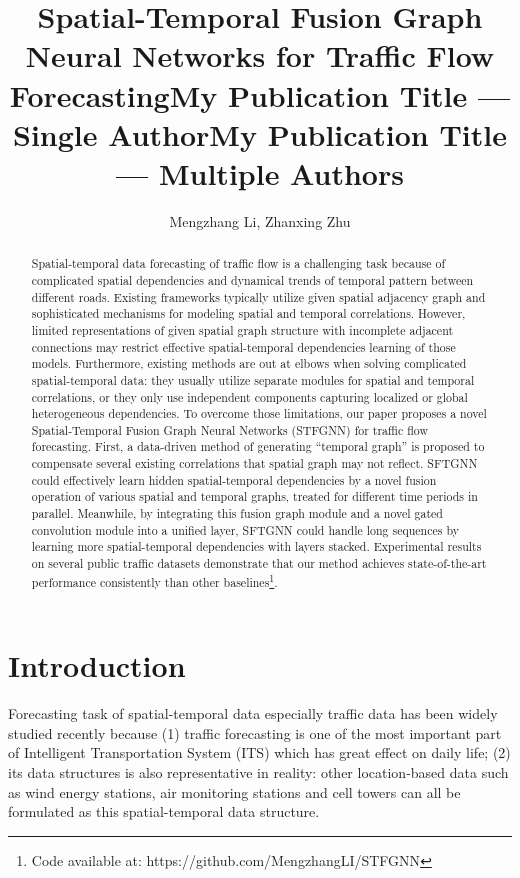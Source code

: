 \documentclass[letterpaper]{article} \usepackage{aaai21}  \usepackage{times}  \usepackage{helvet} \usepackage{courier}  \usepackage[hyphens]{url}  \usepackage{graphicx} \urlstyle{rm} \def\UrlFont{\rm}  \usepackage{natbib}  \usepackage{caption} \frenchspacing  \setlength{\pdfpagewidth}{8.5in}  \setlength{\pdfpageheight}{11in}  \usepackage{multirow}
\title{Spatial-Temporal Fusion Graph Neural Networks for Traffic Flow Forecasting}
\author{
Mengzhang Li, Zhanxing Zhu\\
}
\title{My Publication Title --- Single Author}
\title{My Publication Title --- Multiple Authors}
\begin{document}
\maketitle

\begin{abstract}
Spatial-temporal data forecasting of traffic flow is a challenging task because of complicated spatial dependencies and dynamical trends of temporal pattern between different roads. Existing frameworks typically utilize given spatial adjacency graph and sophisticated mechanisms for modeling spatial and temporal correlations. However, limited representations of given spatial graph structure with incomplete adjacent connections may restrict effective spatial-temporal dependencies learning of those models. Furthermore, existing methods are out at elbows when solving complicated spatial-temporal data: they usually utilize separate modules for spatial and temporal correlations, or they only use independent components capturing localized or global heterogeneous dependencies. To overcome those limitations, our paper proposes a novel Spatial-Temporal Fusion Graph Neural Networks (STFGNN) for traffic flow forecasting. First, a data-driven method of generating “temporal graph” is proposed to compensate several existing correlations that spatial graph may not reflect. SFTGNN could effectively learn hidden spatial-temporal dependencies by a novel fusion operation of various spatial and temporal graphs, treated for different time periods in parallel. Meanwhile, by integrating this fusion graph module and a novel gated convolution module into a unified layer, SFTGNN could handle long sequences by learning more spatial-temporal dependencies with layers stacked. Experimental results on several public traffic datasets demonstrate that our method achieves state-of-the-art performance consistently than other baselines\footnote{Code available at: https://github.com/MengzhangLI/STFGNN}.
\end{abstract}

\section{Introduction}
Forecasting task of spatial-temporal data especially traffic data has been widely studied recently because (1) traffic forecasting is one of the most important part of Intelligent Transportation System (ITS) which has great effect on daily life; (2) its data structures is also representative in reality: other location-based data such as wind energy stations, air monitoring stations and cell towers can all be formulated as this spatial-temporal data structure. 
\end{document}
